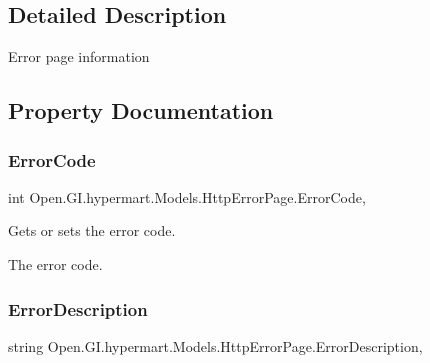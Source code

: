 \subsection{Detailed Description}
Error page information 



\subsection{Property Documentation}
\hypertarget{class_open_1_1_g_i_1_1hypermart_1_1_models_1_1_http_error_page_a1bf51383a2ce1467237ed44fce2214f0}{}\label{class_open_1_1_g_i_1_1hypermart_1_1_models_1_1_http_error_page_a1bf51383a2ce1467237ed44fce2214f0} 
\subsubsection{\texorpdfstring{Error\+Code}{ErrorCode}}
{\footnotesize\ttfamily int Open.\+G\+I.\+hypermart.\+Models.\+Http\+Error\+Page.\+Error\+Code\hspace{0.3cm}{\ttfamily [get]}, {\ttfamily [set]}}



Gets or sets the error code. 

The error code. \hypertarget{class_open_1_1_g_i_1_1hypermart_1_1_models_1_1_http_error_page_af5e4bfc21400b65117b1a23090adadb6}{}\label{class_open_1_1_g_i_1_1hypermart_1_1_models_1_1_http_error_page_af5e4bfc21400b65117b1a23090adadb6} 
\subsubsection{\texorpdfstring{Error\+Description}{ErrorDescription}}
{\footnotesize\ttfamily string Open.\+G\+I.\+hypermart.\+Models.\+Http\+Error\+Page.\+Error\+Description\hspace{0.3cm}{\ttfamily [get]}, {\ttfamily [set]}}



